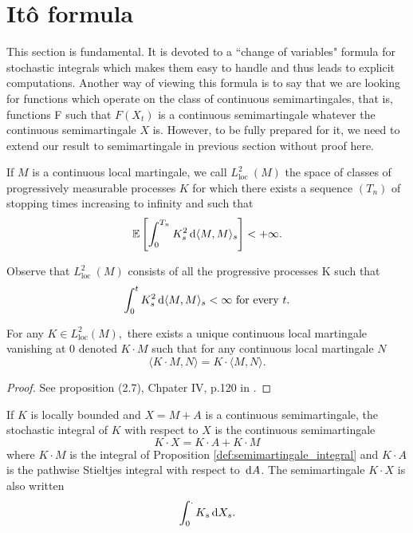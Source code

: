 \section{Itô formula}
This section is fundamental. It is devoted to a ``change of variables" formula for
stochastic integrals which makes them easy to handle and thus leads to explicit
computations.
Another way of viewing this formula is to say that we are looking for functions
which operate on the class of continuous semimartingales, that is, functions F such
that $ F (X_t ) $ is a continuous semimartingale whatever the continuous semimartingale
$ X $ is.  However, to be fully prepared for it, we need to extend our result to semimartingale in previous section without proof here.

\begin{definition}
	If $M$ is a continuous local martingale, we call $L_{\text {loc }}^{2}(M)$ the space of classes of progressively measurable processes $K$ for which there exists a sequence $\left(T_{n}\right)$ of stopping times increasing to infinity and such that \[ \mathbb{E}\left[\int_{0}^{T_{n}} K_{s}^{2}\,\mathrm{d}\langle M, M\rangle_{s}\right]<+\infty. \]
\end{definition}
Observe that $L_{\text {loc }}^{2}(M)$ consists of all the progressive processes K such that
 \[ \int_{0}^{t} K_{s}^{2} \,\mathrm{d} \langle M, M\rangle_{s}<\infty \text { for every } t .\]
\begin{proposition}\label{def:semimartingale_integral}
	For any $K \in L_{\mathrm{loc}}^{2}(M),$ there exists a unique continuous local martingale vanishing at 0 denoted $K \cdot M$ such that for any continuous local martingale $N$
	\[ \langle K \cdot M, N\rangle=K \cdot\langle M, N\rangle .\]
\end{proposition}
\begin{proof}
	See proposition (2.7), Chpater IV, p.120 in \cite{revuz2013continuous}.
\end{proof}
\begin{definition}
	If $K$ is locally bounded and $X=M+A$ is a continuous semimartingale, the stochastic integral of $K$ with respect to $X$ is the continuous semimartingale
	\[ K \cdot X = K \cdot A + K \cdot M \]
	where $K \cdot M$ is the integral of Proposition \ref{def:semimartingale_integral} and $K \cdot A$ is the pathwise Stieltjes integral with respect to $ \,\mathrm{d} A $. The semimartingale $K \cdot X$ is also written \[ \int_{0}^{.} K_{s} \,\mathrm{d} X_{s} .\]
\end{definition}

